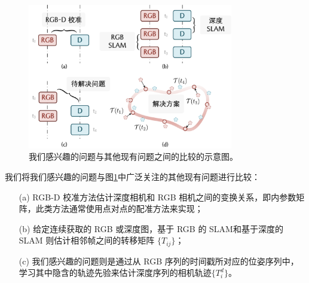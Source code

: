 \begin{figure}[ht]
    \centering
    \includegraphics[width=0.8\textwidth]{undergraduate-thesis/images/time-pose function/teaser.pdf}
    \caption{我们感兴趣的问题与其他现有问题之间的比较的示意图。}
    \label{fig: time-pose function teaser}
\end{figure}

我们将我们感兴趣的问题与图\ref{fig: time-pose function teaser}中广泛关注的其他现有问题进行比较：
\begin{enumerate}
    \item [(a)]RGB-D 校准方法\cite{jeong_self-calibrating_2021, bian_nope-nerf_2022}估计深度相机和 RGB 相机之间的变换关系，即内参数矩阵，此类方法通常使用点对点的配准方法来实现；
    \item [(b)] 给定连续获取的 RGB 或深度图，基于 RGB 的 SLAM\cite{campos_orb-slam3_2021, mur-artal_orb-slam_2015, engel_direct_2018, zhu_nicer-slam_2023}和基于深度的 SLAM \cite{niesner_real-time_2013, xu_multi-scale_2018}则估计相邻帧之间的转移矩阵 $\{T_{ij}\}$；
    \item [(c)] 我们感兴趣的问题则是通过从 RGB 序列的时间戳所对应的位姿序列中，学习其中隐含的轨迹先验来估计深度序列的相机轨迹$\{T_i^d\}$。
\end{enumerate}

